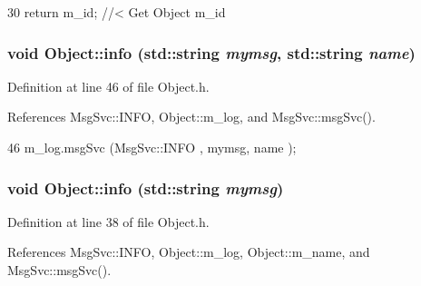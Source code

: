 \begin{DoxyCode}
30 { return m_id;         } //< Get Object m_id 
\end{DoxyCode}
\hypertarget{classObject_a1ca123253dfd30fc28b156f521dcbdae}{
\subsubsection[{info}]{\setlength{\rightskip}{0pt plus 5cm}void Object::info (std::string {\em mymsg}, \/  std::string {\em name})}}
\label{classObject_a1ca123253dfd30fc28b156f521dcbdae}


Definition at line 46 of file Object.h.

References MsgSvc::INFO, Object::m\_\-log, and MsgSvc::msgSvc().


\begin{DoxyCode}
46 { m_log.msgSvc (MsgSvc::INFO    , mymsg, name ); }
\end{DoxyCode}
\hypertarget{classObject_a644fd329ea4cb85f54fa6846484b84a8}{
\subsubsection[{info}]{\setlength{\rightskip}{0pt plus 5cm}void Object::info (std::string {\em mymsg})}}
\label{classObject_a644fd329ea4cb85f54fa6846484b84a8}


Definition at line 38 of file Object.h.

References MsgSvc::INFO, Object::m\_\-log, Object::m\_\-name, and MsgSvc::msgSvc().

